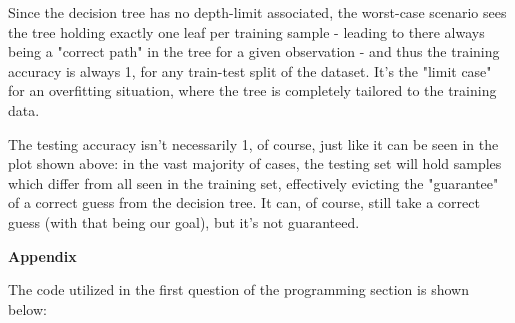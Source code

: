 \documentclass[12pt]{article}
\begin{document}
\begin{enumerate}[leftmargin=\labelsep,resume]
        Since the decision tree has no depth-limit associated, the worst-case scenario sees the tree
        holding exactly one leaf per training sample - leading to there always being a "correct path" in the tree for a given observation - and thus the training accuracy is always 1, for any train-test split of the dataset.
        It's the "limit case" for an overfitting situation, where the tree is completely tailored to the training data.

        The testing accuracy isn't necessarily 1, of course, just like it can be seen in the plot shown above: in the vast majority of cases, the testing set will hold samples which differ from all seen in the training set, effectively evicting the "guarantee" of a correct guess from the decision tree. It can, of course, still take a correct guess (with that being our goal), but it's not guaranteed.

\end{enumerate}

\large{\textbf{Appendix}\vskip 0.3cm}

The code utilized in the first question of the programming section is shown below:


\end{document}
